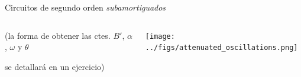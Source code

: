 \documentclass[aspectratio=169, usenames,svgnames,dvipsnames]{beamer}
\begin{document}
\begin{frame}{Circuitos de segundo orden \hspace{2mm}\textit{subamortiguados}}
\begin{columns}
\begin{column}{0.65\columnwidth}
        \vspace{-3mm}
        
        \begin{center}
            \small (la forma de obtener las ctes. $B'$, $\alpha$, $\omega$ y $\theta$

            \vspace{0mm}
            se detallará en un ejercicio)   
        \end{center}
    \end{column}
    \begin{column}{0.3\columnwidth}
        \texttt{[image: ../figs/attenuated\_oscillations.png]}
    \end{column}
    \end{columns}
\end{frame}

\end{document}
